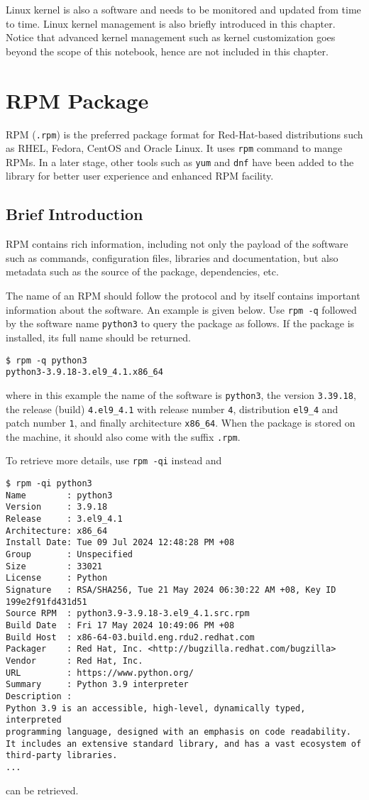 Linux kernel is also a software and needs to be monitored and updated from time to time. Linux kernel management is also briefly introduced in this chapter. Notice that advanced kernel management such as kernel customization goes beyond the scope of this notebook, hence are not included in this chapter.

\section{RPM Package}

RPM (\verb|.rpm|) is the preferred package format for Red-Hat-based distributions such as RHEL, Fedora, CentOS and Oracle Linux. It uses \verb|rpm| command to mange RPMs. In a later stage, other tools such as \verb|yum| and \verb|dnf| have been added to the library for better user experience and enhanced RPM facility. 

\subsection{Brief Introduction}

RPM contains rich information, including not only the payload of the software such as commands, configuration files, libraries and documentation, but also metadata such as the source of the package, dependencies, etc.

The name of an RPM should follow the protocol and by itself contains important information about the software. An example is given below. Use \verb|rpm -q| followed by the software name \verb|python3| to query the package as follows. If the package is installed, its full name should be returned.
\begin{lstlisting}
$ rpm -q python3
python3-3.9.18-3.el9_4.1.x86_64
\end{lstlisting}
where in this example the name of the software is \verb|python3|, the version \verb|3.39.18|, the release (build) \verb|4.el9_4.1| with release number \verb|4|, distribution \verb|el9_4| and patch number \verb|1|, and finally architecture \verb|x86_64|. When the package is stored on the machine, it should also come with the suffix \verb|.rpm|. 

To retrieve more details, use \verb|rpm -qi| instead and
\begin{lstlisting}
$ rpm -qi python3
Name        : python3
Version     : 3.9.18
Release     : 3.el9_4.1
Architecture: x86_64
Install Date: Tue 09 Jul 2024 12:48:28 PM +08
Group       : Unspecified
Size        : 33021
License     : Python
Signature   : RSA/SHA256, Tue 21 May 2024 06:30:22 AM +08, Key ID 199e2f91fd431d51
Source RPM  : python3.9-3.9.18-3.el9_4.1.src.rpm
Build Date  : Fri 17 May 2024 10:49:06 PM +08
Build Host  : x86-64-03.build.eng.rdu2.redhat.com
Packager    : Red Hat, Inc. <http://bugzilla.redhat.com/bugzilla>
Vendor      : Red Hat, Inc.
URL         : https://www.python.org/
Summary     : Python 3.9 interpreter
Description :
Python 3.9 is an accessible, high-level, dynamically typed, interpreted
programming language, designed with an emphasis on code readability.
It includes an extensive standard library, and has a vast ecosystem of
third-party libraries.
...
\end{lstlisting}
can be retrieved.

